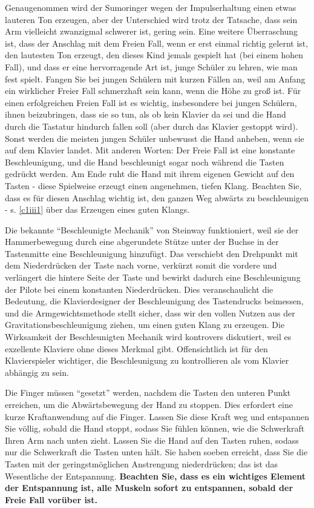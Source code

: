 Genaugenommen wird der Sumoringer wegen der Impulserhaltung einen etwas lauteren Ton erzeugen, aber der Unterschied wird trotz der Tatsache, dass sein Arm vielleicht zwanzigmal schwerer ist, gering sein.
Eine weitere Überraschung ist, dass der Anschlag mit dem Freien Fall, wenn er erst einmal richtig gelernt ist, den lautesten Ton erzeugt, den dieses Kind jemals gespielt hat (bei einem hohen Fall), und dass er eine hervorragende Art ist, junge Schüler zu lehren, wie man fest spielt.
Fangen Sie bei jungen Schülern mit kurzen Fällen an, weil am Anfang ein wirklicher Freier Fall schmerzhaft sein kann, wenn die Höhe zu groß ist.
Für einen erfolgreichen Freien Fall ist es wichtig, insbesondere bei jungen Schülern, ihnen beizubringen, dass sie so tun, als ob kein Klavier da sei und die Hand durch die Tastatur hindurch fallen soll (aber durch das Klavier gestoppt wird).
Sonst werden die meisten jungen Schüler unbewusst die Hand anheben, wenn sie auf dem Klavier landet.
Mit anderen Worten: Der Freie Fall ist eine konstante Beschleunigung, und die Hand beschleunigt sogar noch während die Tasten gedrückt werden.
Am Ende ruht die Hand mit ihrem eigenen Gewicht auf den Tasten - diese Spielweise erzeugt einen angenehmen, tiefen Klang.
Beachten Sie, dass es für diesen Anschlag wichtig ist, den ganzen Weg abwärts zu beschleunigen - s. \hyperref[c1iii1]{\ref*{c1iii1}} über das Erzeugen eines guten Klangs.

Die bekannte \enquote{Beschleunigte Mechanik} von Steinway funktioniert, weil sie der Hammerbewegung durch eine abgerundete Stütze unter der Buchse in der Tastenmitte eine Beschleunigung hinzufügt.
Das verschiebt den Drehpunkt mit dem Niederdrücken der Taste nach vorne, verkürzt somit die vordere und verlängert die hintere Seite der Taste und bewirkt dadurch eine Beschleunigung der Pilote bei einem konstanten Niederdrücken.
Dies veranschaulicht die Bedeutung, die Klavierdesigner der Beschleunigung des Tastendrucks beimessen, und die Armgewichtsmethode stellt sicher, dass wir den vollen Nutzen aus der Gravitationsbeschleunigung ziehen, um einen guten Klang zu erzeugen.
Die Wirksamkeit der Beschleunigten Mechanik wird kontrovers diskutiert, weil es exzellente Klaviere ohne dieses Merkmal gibt.
Offensichtlich ist für den Klavierspieler wichtiger, die Beschleunigung zu kontrollieren als vom Klavier abhängig zu sein.

Die Finger müssen \enquote{gesetzt} werden, nachdem die Tasten den unteren Punkt erreichen, um die Abwärtsbewegung der Hand zu stoppen.
Dies erfordert eine kurze Kraftanwendung auf die Finger.
Lassen Sie diese Kraft weg und entspannen Sie völlig, sobald die Hand stoppt, sodass Sie fühlen können, wie die Schwerkraft Ihren Arm nach unten zieht.
Lassen Sie die Hand auf den Tasten ruhen, sodass nur die Schwerkraft die Tasten unten hält.
Sie haben soeben erreicht, dass Sie die Tasten mit der geringstmöglichen Anstrengung niederdrücken; das ist das Wesentliche der Entspannung.
\textbf{Beachten Sie, dass es ein wichtiges Element der Entspannung ist, alle Muskeln sofort zu entspannen, sobald der Freie Fall vorüber ist.}

